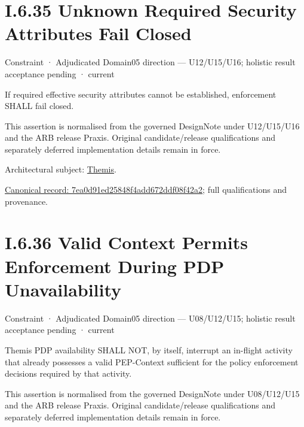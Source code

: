 \section*{I.6.35 Unknown Required Security Attributes Fail Closed}
\label{navigation:I.6.35}

\label{element:7ea0d91ed25848f4add672ddf08f42a2}
{\small Constraint · Adjudicated Domain05 direction — U12/U15/U16; holistic result acceptance pending · current}\par

If required effective security attributes cannot be established, enforcement SHALL fail closed.



This assertion is normalised from the governed DesignNote under U12/U15/U16 and the ARB release Praxis. Original candidate/release qualifications and separately deferred implementation details remain in force.



Architectural subject: \hyperref[element:899d34ec491948b68aad09e507dea6d1]{Themis}.


{\footnotesize \href{../../../../continuum/motivation/constraint/7ea0d91ed25848f4add672ddf08f42a2.md}{Canonical record: 7ea0d91ed25848f4add672ddf08f42a2}; full qualifications and provenance.}\par
\section*{I.6.36 Valid Context Permits Enforcement During PDP Unavailability}
\label{navigation:I.6.36}

\label{element:5a6285eb1a1646e1badd693b8c175f01}
{\small Constraint · Adjudicated Domain05 direction — U08/U12/U15; holistic result acceptance pending · current}\par

Themis PDP availability SHALL NOT, by itself, interrupt an in-flight activity that already possesses a valid PEP-Context sufficient for the policy enforcement decisions required by that activity.



This assertion is normalised from the governed DesignNote under U08/U12/U15 and the ARB release Praxis. Original candidate/release qualifications and separately deferred implementation details remain in force.



